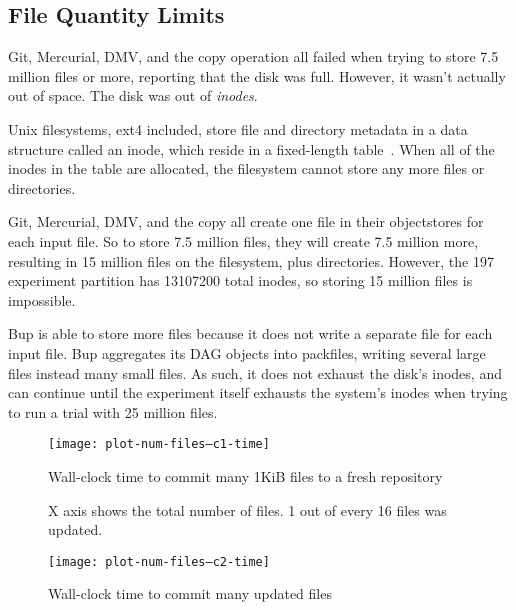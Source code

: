 \subsection{File Quantity Limits}

Git, Mercurial, DMV, and the copy operation all failed when trying to store
\num{7.5} million files or more, reporting that the disk was full. However, it
wasn't actually out of space. The disk was out of \emph{\glspl{inode}}.


Unix filesystems, ext4 included, store file and directory metadata in a data
structure called an \gls{inode}, which reside in a fixed-length
table~\cite{unix_timesharing_system}. When all of the \glspl{inode} in the table
are allocated, the filesystem cannot store any more files or directories.

Git, Mercurial, DMV, and the copy all create one file in their
\glspl{objectstore} for each input file. So to store \num{7.5} million files,
they will create \num{7.5} million more, resulting in \num{15} million files on
the filesystem, plus directories. However, the \SI{197}{\gib} experiment
partition has \num{13107200} total \glspl{inode}, so storing \num{15} million
files is impossible.

Bup is able to store more files because it does not write a separate file for
each input file. Bup aggregates its DAG objects into \glspl{packfile}, writing
several large files instead many small files. As such, it does not exhaust the
disk's \glspl{inode}, and can continue until the experiment itself exhausts the
system's \glspl{inode} when trying to run a trial with \num{25} million files.

%

\begin{figure}[p]
    \begin{leftfullpage}
        \caption{Wall-clock time to commit many 1KiB files to a fresh repository}
        \label{fig:plot-num-files--c1-time}
        \centering

        \explainlogsubfig

        \texttt{[image: plot-num-files--c1-time]}
    \end{leftfullpage}
\end{figure}

\begin{figure}[p]
    \begin{leftfullpage}
        \caption{Wall-clock time to commit many updated files}
        \label{fig:plot-num-files--c2-time}
        \centering

        X axis shows the total number of files. 1 out of every 16 files was updated.
        \explainlogsubfig

        \texttt{[image: plot-num-files--c2-time]}
    \end{leftfullpage}
\end{figure}

